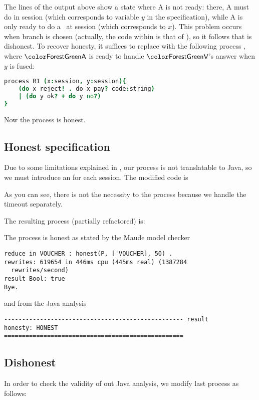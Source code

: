 The lines of the output above show a state where {\pmv A} is not ready:
there, {\pmv A} must do  in session \mbox{}
(which corresponds to variable $y$ in the \coco specification),
while {\pmv A} is only ready to do a \rj\ at session  
(which corresponds to $x$).
This problem occurs when branch  is chosen
(actually, the code within  is that of ),
so it follows that  is dishonest.
%
To recover honesty, it suffices to replace  with the following process , %
where $\pmv{A}$ is ready to handle $\pmv{V}$'s answer when $y$ is fused:

\begin{lstlisting}[language=coco]
process R1 (x:session, y:session){
    (do x reject! . do x pay? code:string)
    | (do y ok? + do y no?)
}
\end{lstlisting}

Now the process  is honest.

\subsection{Honest specification}\label{ex:voucher-honest}
Due to some limitations explained in , our process is not translatable to Java, so we must introduce an  for each session.
The modified code is

As you can see, there is not the necessity to the process  because we handle the timeout separately.

The resulting process (partially refactored) is:

The process is honest as stated by the Maude model checker
\begin{lstlisting}
reduce in VOUCHER : honest(P, ['VOUCHER], 50) .
rewrites: 619654 in 446ms cpu (445ms real) (1387284 
  rewrites/second)
result Bool: true
Bye.
\end{lstlisting}

and from the Java analysis
\begin{lstlisting}
-------------------------------------------------- result
honesty: HONEST
==================================================
\end{lstlisting}

\subsection{Dishonest}\label{ex:voucher-dishonest}
In order to check the validity of out Java analysis, we modify last  process as follows:

